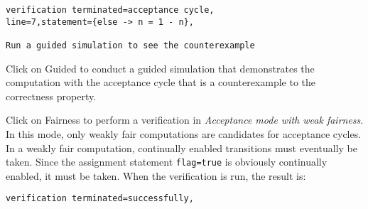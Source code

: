 \documentclass[11pt]{article}
\newcommand*{\p}[1]{\texttt{#1}}
\newcommand*{\bu}[1]{\textsf{#1}}
\begin{document}
\begin{verbatim}
verification terminated=acceptance cycle,
line=7,statement={else -> n = 1 - n},

Run a guided simulation to see the counterexample
\end{verbatim}

Click on \bu{Guided} to conduct a guided simulation that demonstrates
the computation with the acceptance cycle that is a counterexample to
the correctness property.

Click on \bu{Fairness} to perform a verification in \emph{Acceptance
mode with weak fairness}. In this mode, only weakly fair computations
are candidates for acceptance cycles. In a weakly fair computation,
continually enabled transitions must eventually be taken. Since the
assignment statement \p{flag=true} is obviously continually enabled, it
must be taken. When the verification is run, the result is:

\begin{verbatim}
verification terminated=successfully,
\end{verbatim}
\end{document}
